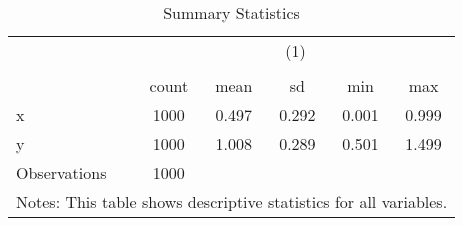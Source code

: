 \begin{table}[htbp]\centering
\def\sym#1{\ifmmode^{#1}\else\(^{#1}\)\fi}
\caption{Summary Statistics}
\begin{tabular}{l*{1}{ccccc}}
\toprule
                    &\multicolumn{5}{c}{(1)}                                         \\
                    &\multicolumn{5}{c}{}                                            \\
                    &       count&        mean&          sd&         min&         max\\
\midrule
x                   &        1000&       0.497&       0.292&       0.001&       0.999\\
y                   &        1000&       1.008&       0.289&       0.501&       1.499\\
\midrule
Observations        &        1000&            &            &            &            \\
\bottomrule
\multicolumn{6}{l}{\footnotesize Notes: This table shows descriptive statistics for all variables.}\\
\end{tabular}
\end{table}

